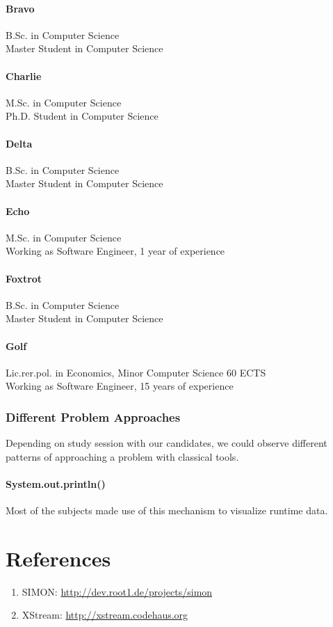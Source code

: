 \documentclass{report}
\begin{document}
\subsubsection*{Bravo} %
B.Sc. in Computer Science\\
Master Student  in Computer Science
\subsubsection*{Charlie} %
M.Sc. in Computer Science\\ %
Ph.D. Student in Computer Science
\subsubsection*{Delta} %
B.Sc. in Computer Science\\
Master Student  in Computer Science
\subsubsection*{Echo} %
M.Sc. in Computer Science\\
Working as Software Engineer, 1 year of experience
\subsubsection*{Foxtrot} %
B.Sc. in Computer Science\\
Master Student  in Computer Science
\subsubsection*{Golf} %
Lic.rer.pol. in Economics, Minor Computer Science 60 ECTS\\
Working as Software Engineer, 15 years of experience

\subsection*{Different Problem Approaches}
Depending on study session with our candidates, we could observe different patterns of approaching a problem with classical tools.
\subsubsection*{System.out.println()}
Most of the subjects made use of this mechanism to visualize runtime data.

\chapter*{References}
\begin{enumerate}
\item
SIMON: \url{http://dev.root1.de/projects/simon}
\item
XStream: \url{http://xstream.codehaus.org}
\end{enumerate}
\end{document}
